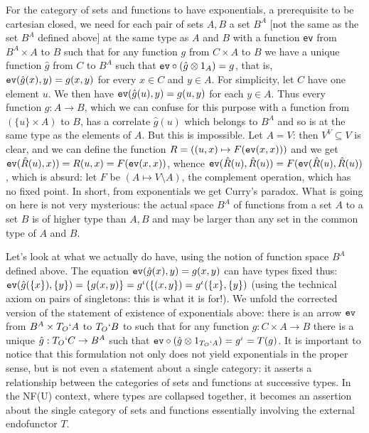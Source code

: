 \documentclass[12pt]{article}
\begin{document}
For the category of sets and functions to have exponentials, a prerequisite to be cartesian closed, we need for each pair of sets $A,B$ a set $B^A$ [not the same as the set $B^A$ defined above] at the same type as $A$ and $B$ with a function
{\tt ev} from $B^A \times A$ to $B$ such that for any function $g$ from $C \times A$ to $B$ we have a unique function $\hat{g}$ from $C$ to $B^A$ such that
${\tt ev}\circ (\hat{g} \otimes 1_A) = g$, that is, ${\tt ev}(\hat{g}(x),y) = g(x,y)$ for every $x \in C$ and $y \in A$.  For simplicity, let $C$ have one element $u$.
We then have ${\tt ev}(\hat{g}(u),y) = g(u,y)$ for each $y \in A$.  Thus every function $g:A \rightarrow B$, which we can confuse for this purpose with
a function from $(\{u\} \times A)$ to $B$,  has a correlate $\hat{g}(u)$ which belongs to $B^A$ and so is at the same type as the elements of $A$.  But this is impossible.
Let $A = V$:  then $V^V \subseteq V$ is clear, and we can define the function $R= ((u,x) \mapsto F({\tt ev}(x,x)))$  and we get ${\tt ev}(\hat{R}(u),x)) = R(u,x) = F({\tt ev}(x,x))$, whence
${\tt ev}(\hat{R}(u),\hat R(u)) = F({\tt ev}(\hat R(u),\hat R(u))$, which is absurd:  let $F$ be $(A \mapsto V \setminus A)$, the complement operation, which has no fixed point.  In short, from exponentials we get Curry's paradox.  What is going on here is not very mysterious:  the actual space $B^A$ of functions from a set $A$ to a set $B$ is of higher type than $A, B$ and may be larger than any set in the common type of $A$ and $B$.

Let's look at what we actually do have, using the notion of function space $B^A$ defined above.   The equation ${\tt ev}(\hat g(x),y) = g(x,y)$ can have types fixed thus:  ${\tt ev}(\hat g(\{x\}),\{y\}) = \{g(x,y)\} = g^{\iota}(\{(x,y\}) = g^{\iota}(\{x\},\{y\})$ (using the technical axiom on pairs of singletons:  this is what it is for!).    We unfold the corrected
version of the statement of existence of exponentials above:  there is an arrow ${\tt ev}$ from $B^A \times T_O`A$ to $T_O`B$  to such that for any function $g:C \times A \rightarrow B$ there is a unique
$\hat g :T_O`C \rightarrow B^A$ such that ${\tt ev} \circ (\hat g \otimes 1_{T_O`A}) = g^\iota = T(g)$.    It is important to notice that this formulation not only does not yield exponentials in the proper sense, but is not even a statement about a single category:  it asserts a relationship between the categories of sets and functions at successive types.   In the NF(U) context, where types are collapsed together, it becomes an assertion about the single category of sets and functions essentially involving the external endofunctor $T$.
\end{document}
